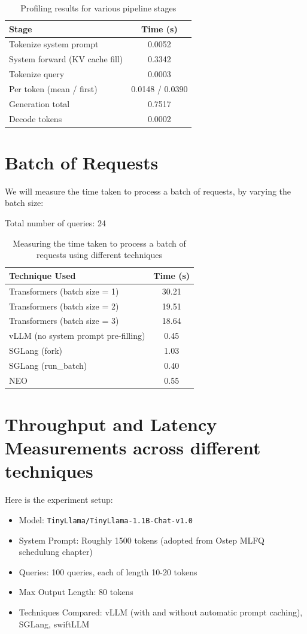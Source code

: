 \begin{table}[h]
\centering
\begin{tabular}{|l|c|}
\hline
\textbf{Stage} & \textbf{Time (s)} \\
\hline
Tokenize system prompt & 0.0052 \\
System forward (KV cache fill) & 0.3342 \\
Tokenize query & 0.0003 \\
Per token (mean / first) & 0.0148 / 0.0390 \\
Generation total & 0.7517 \\
Decode tokens & 0.0002 \\
\hline
\end{tabular}
\caption{Profiling results for various pipeline stages}
\end{table}


\section{Batch of Requests} 
We will measure the time taken to process a batch of requests, by varying the batch size:

Total number of queries:  24

\begin{table}[h]
\centering
\begin{tabular}{|l|c|}
\hline
\textbf{Technique Used} & \textbf{Time (s)} \\
\hline
Transformers (batch size = 1) & 30.21 \\
Transformers (batch size = 2) & 19.51 \\
Transformers (batch size = 3) & 18.64 \\
vLLM (no system prompt pre-filling) & 0.45 \\
SGLang (fork) & 1.03 \\
SGLang (run\_batch) & 0.40 \\
NEO & 0.55 \\
\hline
\end{tabular}
\caption{Measuring the time taken to process a batch of requests using different techniques}
\end{table}

\section{Throughput and Latency Measurements across different techniques}
Here is the experiment setup:
\begin{itemize}
    \item Model: \texttt{TinyLlama/TinyLlama-1.1B-Chat-v1.0}
    \item System Prompt: Roughly 1500 tokens (adopted from Ostep MLFQ schedulung chapter)
    \item Queries: 100 queries, each of length 10-20 tokens
    \item Max Output Length: 80 tokens
    \item Techniques Compared: vLLM (with and without automatic prompt caching), SGLang, swiftLLM
\end{itemize}

